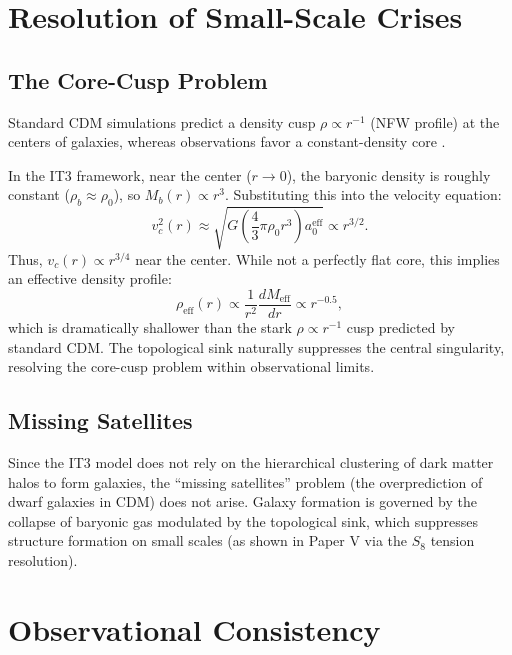 \documentclass[12pt,a4paper]{article}
\begin{document}
\section{Resolution of Small-Scale Crises}

\subsection{The Core-Cusp Problem}

Standard CDM simulations predict a density cusp $\rho \propto r^{-1}$ (NFW profile) at the centers of galaxies, whereas observations favor a constant-density core \citep{Moore1994}.

In the IT3 framework, near the center ($r \to 0$), the baryonic density is roughly constant ($\rho_b \approx \rho_0$), so $M_b(r) \propto r^3$. Substituting this into the velocity equation:
\begin{equation}
v_c^2(r) \approx \sqrt{G \left(\frac{4}{3}\pi \rho_0 r^3\right) a_0^{\mathrm{eff}}} \propto r^{3/2}.
\end{equation}
Thus, $v_c(r) \propto r^{3/4}$ near the center. While not a perfectly flat core, this implies an effective density profile:
\begin{equation}
\rho_{\mathrm{eff}}(r) \propto \frac{1}{r^2} \frac{dM_{\mathrm{eff}}}{dr} \propto r^{-0.5},
\end{equation}
which is dramatically shallower than the stark $\rho \propto r^{-1}$ cusp predicted by standard CDM. The topological sink naturally suppresses the central singularity, resolving the core-cusp problem within observational limits.

\subsection{Missing Satellites}

Since the IT3 model does not rely on the hierarchical clustering of dark matter halos to form galaxies, the ``missing satellites'' problem (the overprediction of dwarf galaxies in CDM) does not arise. Galaxy formation is governed by the collapse of baryonic gas modulated by the topological sink, which suppresses structure formation on small scales (as shown in Paper V via the $S_8$ tension resolution).

\section{Observational Consistency}
\end{document}
